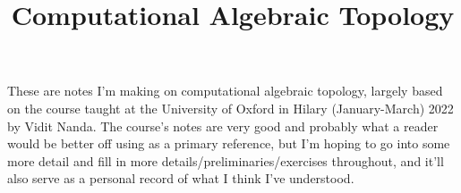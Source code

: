 \documentclass{reconstruction}
\title{Computational Algebraic Topology}
\begin{document}
    \maketitle

    These are notes I'm making on computational algebraic topology, largely based on the course taught at the University of Oxford in Hilary (January-March) 2022 by Vidit Nanda. The course's notes are very good and probably what a reader would be better off using as a primary reference, but I'm hoping to go into some more detail and fill in more details/preliminaries/exercises throughout, and it'll also serve as a personal record of what I think I've understood.

    \nopagebreak
    \dominitoc
    \tableofcontents
    \nopagebreak

    
    
\end{document}
